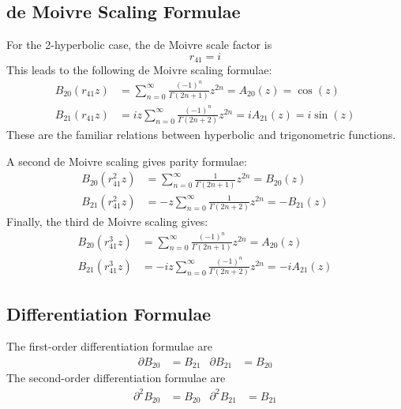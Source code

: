 \subsection{de Moivre Scaling Formulae}
For the 2-hyperbolic case, the de Moivre scale factor is
\begin{equation}
    r_{41} = i
\end{equation}
This leads to the following de Moivre scaling formulae:
\begin{align}
    B_{20}\left( r_{41}  z\right) &= \sum_{n = 0}^{\infty} \frac{(-1)^{n}}{\Gamma\left(2n + 1\right)} z^{2n} = A_{20}(z) = \cos(z) \\
    B_{21}\left( r_{41}  z\right) &= i z \sum_{n = 0}^{\infty} \frac{(-1)^{n}}{\Gamma\left(2n + 2\right)} z^{2n} = iA_{21}(z) = i \sin(z)
\end{align}
These are the familiar relations between hyperbolic and trigonometric functions.

A second de Moivre scaling gives parity formulae:
\begin{align}
    B_{20}\left( r_{41}^{2}  z\right) &= \sum_{n = 0}^{\infty} \frac{1}{\Gamma\left(2n + 1\right)} z^{2n} = B_{20}(z) \\
    B_{21}\left( r_{41}^{2}  z\right) &= {-z} \sum_{n = 0}^{\infty} \frac{1}{\Gamma\left(2n + 2\right)} z^{2n} = -B_{21}(z)
\end{align}
Finally, the third de Moivre scaling gives:
\begin{align}
    B_{20}\left( r_{41}^{3}  z\right) &= \sum_{n = 0}^{\infty} \frac{(-1)^{n}}{\Gamma\left(2n + 1\right)} z^{2n} = A_{20}(z) \\
    B_{21}\left( r_{41}^{3}  z\right) &= -i z \sum_{n = 0}^{\infty} \frac{(-1)^{n}}{\Gamma\left(2n + 2\right)} z^{2n} = -iA_{21}(z)
\end{align}
\subsection{Differentiation Formulae}
The first-order differentiation formulae are
\begin{align}
    \partial B_{20} &= B_{21} & \partial B_{21} &= B_{20}
\end{align}
The second-order differentiation formulae are
\begin{align}
    \partial^{2} B_{20} &= B_{20} & \partial^{2} B_{21} &= B_{21}
\end{align}
